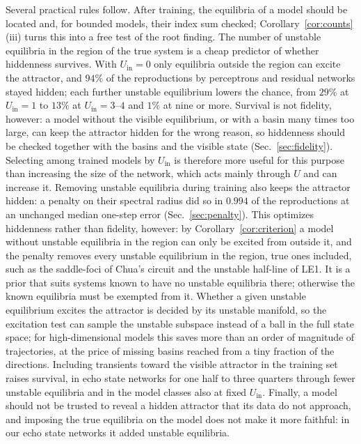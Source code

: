 \documentclass[aip,cha,reprint,amsmath,amssymb,longbibliography]{revtex4-2}
\theoremstyle{definition}
\newcommand{\Uin}{U_{\mathrm{in}}}
\begin{document}
Several practical rules follow. After training, the equilibria of a model should be located and, for bounded models, their
index sum checked; Corollary~\ref{cor:counts}(iii) turns this into a free test of the root finding. The number of unstable
equilibria in the region of the true system is a cheap predictor of whether hiddenness survives. With $\Uin=0$ only equilibria outside the
region can excite the attractor, and $94\%$ of the reproductions by perceptrons and residual networks stayed hidden; each
further unstable equilibrium lowers the chance, from $29\%$ at $\Uin=1$ to $13\%$ at $\Uin=3$--$4$ and $1\%$ at nine or more. Survival is not fidelity, however: a model without the visible
equilibrium, or with a basin many times too large, can keep the attractor hidden for the wrong reason, so hiddenness should
be checked together with the basins and the visible state (Sec.~\ref{sec:fidelity}). Selecting among trained
models by $\Uin$ is therefore more useful for this purpose than increasing the size of the network, which acts mainly through
$U$ and can increase it. Removing unstable equilibria during training also keeps the attractor hidden: a penalty on their
spectral radius did so in $0.994$ of the reproductions at an unchanged median one-step error (Sec.~\ref{sec:penalty}). This
optimizes hiddenness rather than fidelity, however: by Corollary~\ref{cor:criterion} a model without unstable equilibria
in the region can only be excited from outside it, and the penalty removes every unstable equilibrium in the region, true
ones included, such as the saddle-foci of Chua's circuit and the unstable half-line of LE1. It is a prior that suits systems
known to have no unstable equilibria there; otherwise the known equilibria must be exempted from it.
Whether a given unstable equilibrium excites the attractor is decided by its unstable manifold, so the excitation test can
sample the unstable subspace instead of a ball in the full state space; for high-dimensional models this saves more than an
order of magnitude of trajectories, at the price of missing basins reached from a tiny fraction of the directions. Including
transients toward the visible attractor in the training set raises survival, in echo state networks for one half to three
quarters through fewer unstable equilibria and in the model classes also at fixed $\Uin$. Finally, a model should not be trusted to reveal a hidden attractor that its data do
not approach, and imposing the true equilibria on the model does not make it more faithful: in our echo state networks it
added unstable equilibria.
\end{document}
